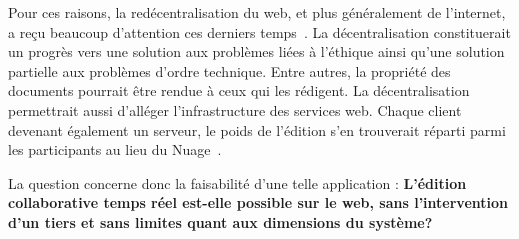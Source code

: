 
Pour ces raisons, la redécentralisation du web, et plus généralement de
l'internet, a reçu beaucoup d'attention ces derniers temps~\cite{benet2014ipfs,
  maelstrom, mansour2016demonstration, wood2014ethereum}.  La décentralisation
constituerait un progrès vers une solution aux problèmes liées à l'éthique ainsi
qu'une solution partielle aux problèmes d'ordre technique.
Entre autres, la propriété des documents pourrait être rendue à ceux qui les
rédigent. La décentralisation permettrait aussi d'alléger l'infrastructure des
services web. Chaque client devenant également un serveur, le poids de l'édition
s'en trouverait réparti parmi les participants au lieu du
Nuage~\cite{mell2011national}.


La question concerne donc la faisabilité d'une telle application :
\textbf{L'édition collaborative temps réel est-elle possible sur le web, sans
  l'intervention d'un tiers et sans limites quant aux dimensions du système?}

